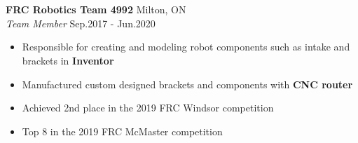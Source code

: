 \documentclass[a4paper]{article}
\newcommand{\lineunder} {
    \vspace*{-8pt} \\
    \hspace*{-18pt} \hrulefill \\
}
\newcommand{\header} [1] {
    {\hspace*{-18pt}\vspace*{6pt} \textsc{#1}}
    \vspace*{-6pt} \lineunder
}
\begin{document}
\header{\textbf{}}
\vspace{1mm}
\textbf{FRC Robotics Team 4992 } \hfill Milton, ON\\
\textit{Team Member} \hfill{Sep.2017 - Jun.2020}\\
\vspace{-1mm}
\begin{itemize} \itemsep -2pt
	\item{Responsible for creating and modeling robot components such as intake and brackets in \textbf{Inventor}}
	\item{Manufactured custom designed brackets and components with \textbf{CNC router}}
	\item{Achieved 2nd place in the 2019 FRC Windsor competition}
	\item{Top 8 in the 2019 FRC McMaster competition}
\end{itemize}
\end{document}
